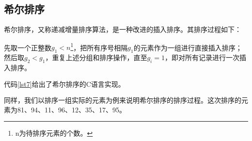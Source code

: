 \documentclass[a4paper, 12pt, titlepage]{article}
\begin{document}
\subsection{希尔排序}
希尔排序，又称递减增量排序算法，是一种改进的插入排序。其排序过程如下：

先取一个正整数$g_1 < n$\footnote{n为待排序元素的个数。}，把所有序号相隔$g_1$的元素作为一组进行直接插入排序；然后取$g_2 < g_1$，重复上述分组和排序操作，直至$g_i = 1$，即对所有记录进行一次插入排序。

代码\ref{lst7}给出了希尔排序的C语言实现。
\begin{spacing}{1.0}
  
\end{spacing}

同样，我们以排序一组实际的元素为例来说明希尔排序的排序过程。这次排序的元素为81、94、11、96、12、35、17、95。
\end{document}
